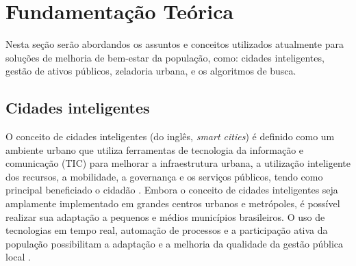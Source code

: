\chapter{Fundamentação Teórica}
\label{cap:fundamentacao-teorica}



Nesta seção serão abordandos os assuntos e conceitos utilizados atualmente para soluções de melhoria de bem-estar da população, 
como: cidades inteligentes, gestão de ativos públicos, zeladoria urbana, e os algoritmos de busca. 

\section{Cidades inteligentes}
O conceito de cidades inteligentes (do inglês, \textit{smart cities}) é definido como um ambiente 
urbano que utiliza ferramentas de tecnologia da informação e comunicação (TIC) para melhorar a 
infraestrutura urbana, a utilização inteligente dos recursos, a mobilidade, a governança e os 
serviços públicos, tendo como principal beneficiado o cidadão \cite{WEISS2015}. Embora o conceito 
de cidades inteligentes seja amplamente implementado em grandes centros urbanos e metrópoles, 
é possível realizar sua adaptação a pequenos e médios municípios brasileiros. O uso de tecnologias 
em tempo real, automação de processos e a participação ativa da população possibilitam a 
adaptação e a melhoria da qualidade da gestão pública local \cite{SANTIAGO2023}.

